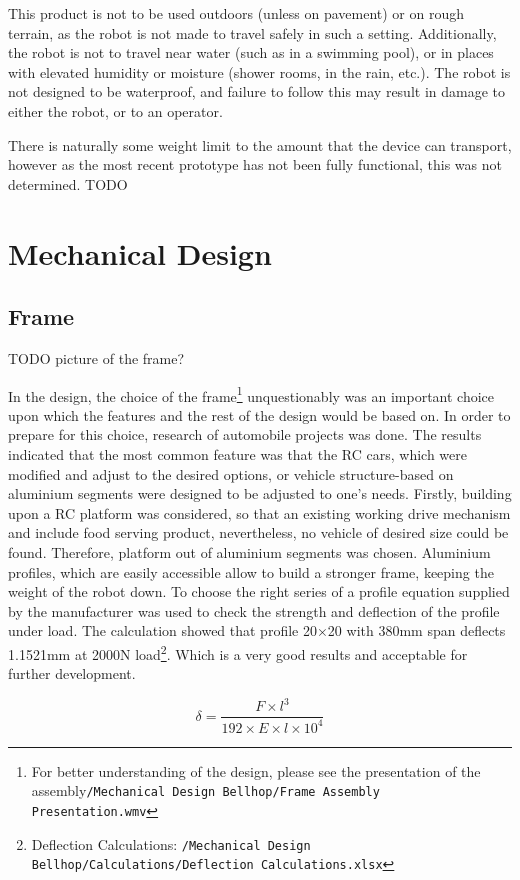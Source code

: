 \documentclass[11pt]{article}
\begin{document}
This product is not to be used outdoors (unless on pavement) or on rough terrain, as the robot is not made to travel safely in such a setting. Additionally, the robot is not to travel near water (such as in a swimming pool), or in places with elevated humidity or moisture (shower rooms, in the rain, etc.). The robot is not designed to be waterproof, and failure to follow this may result in damage to either the robot, or to an operator.


There is naturally some weight limit to the amount that the device can transport, however as the most recent prototype has not been fully functional, this was not determined.
TODO
\newpage
\section{Mechanical Design}
\subsection*{Frame}
TODO picture of the frame?


In the design, the choice of the frame\footnote{For better understanding of the design, please see the presentation of the assembly\texttt{/Mechanical Design Bellhop/Frame Assembly Presentation.wmv}} unquestionably was an important choice upon which the features and the rest of the design would be based on. In order to prepare for this choice, research of automobile projects was done. The results indicated that the most common feature was that the RC cars, which were modified and adjust to the desired options, or vehicle structure-based on aluminium segments were designed to be adjusted to one's needs. Firstly, building upon a RC platform was considered, so that an existing working drive mechanism and include food serving product, nevertheless, no vehicle of desired size could be found. Therefore, platform out of aluminium segments was chosen. Aluminium profiles, which are easily accessible allow to build a stronger frame, keeping the weight of the robot down. To choose the right series of a profile equation supplied by the manufacturer was used to check the strength and deflection of the profile under load. The calculation showed that profile 20$\times$20 with 380mm span deflects 1.1521mm at 2000N load\footnote{Deflection Calculations: \texttt{/Mechanical Design Bellhop/Calculations/Deflection Calculations.xlsx}}. Which is a very good results and acceptable for further development.

$$\delta=\frac{F\times l^3}{192\times E\times l\times 10^4}$$
 
\end{document}
